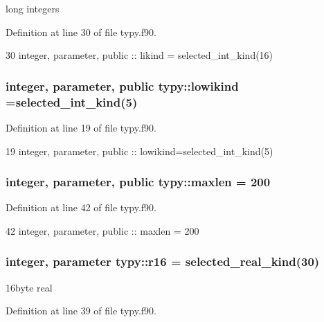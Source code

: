 long integers 



Definition at line 30 of file typy.\+f90.


\begin{DoxyCode}
30     \textcolor{keywordtype}{integer}, \textcolor{keywordtype}{parameter}, \textcolor{keywordtype}{public} :: likind = selected\_int\_kind(16)
\end{DoxyCode}
\subsubsection[{lowikind}]{\setlength{\rightskip}{0pt plus 5cm}integer, parameter, public typy\+::lowikind =selected\+\_\+int\+\_\+kind(5)}\label{namespacetypy_a12500d26e1bc4ac63296b8a3b9eebdec}


Definition at line 19 of file typy.\+f90.


\begin{DoxyCode}
19     \textcolor{keywordtype}{integer}, \textcolor{keywordtype}{parameter}, \textcolor{keywordtype}{public} :: lowikind=selected\_int\_kind(5)
\end{DoxyCode}
\subsubsection[{maxlen}]{\setlength{\rightskip}{0pt plus 5cm}integer, parameter, public typy\+::maxlen = 200}\label{namespacetypy_a9a47109f421c00b5931520ad47c3d986}


Definition at line 42 of file typy.\+f90.


\begin{DoxyCode}
42     \textcolor{keywordtype}{integer}, \textcolor{keywordtype}{parameter}, \textcolor{keywordtype}{public} :: maxlen = 200
\end{DoxyCode}
\subsubsection[{r16}]{\setlength{\rightskip}{0pt plus 5cm}integer, parameter typy\+::r16 = selected\+\_\+real\+\_\+kind(30)}\label{namespacetypy_a091f7740354e90d8be3661156e875533}


16byte real 



Definition at line 39 of file typy.\+f90.



